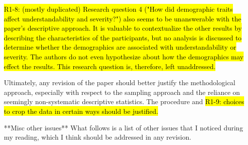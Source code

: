 \hl{R1-8: (mostly duplicated) Research question 4 ("How did demographic traits affect understandability and
severity?") also seems to be unanswerable with the paper's descriptive
approach. It is valuable to contextualize the other results by
describing the characteristics of the participants, but no analysis is
discussed to determine whether the demographics are associated with
understandability or severity. The authors do not even hypothesize
about how the demographics may effect the results. This research
question is, therefore, left unaddressed.}

Ultimately, any revision of the paper should better justify the methodological
approach, especially with respect to the sampling approach and the
reliance on seemingly non-systematic descriptive statistics. The
procedure and \hl{R1-9: choices to crop the data in certain ways should be
justified.}

**Misc other issues**
What follows is a list of other issues that I noticed during my reading, which I
think should be addressed in any revision.


